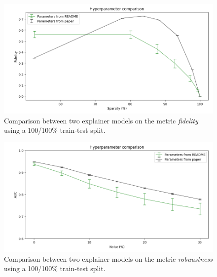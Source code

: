 \begin{figure}[h!]
    \centering
    \includegraphics[width=\linewidth]{Images/fidelity_hyperparameters.png}
    \caption{Comparison between two explainer models on the metric \textit{fidelity} using a 100/100\% train-test split.}
\end{figure}

\begin{figure}[h!]
    \centering
    \includegraphics[width=\linewidth]{Images/noise_hyperparameters.png}
    \caption{Comparison between two explainer models on the metric \textit{robuustness} using a 100/100\% train-test split.}
\end{figure}

